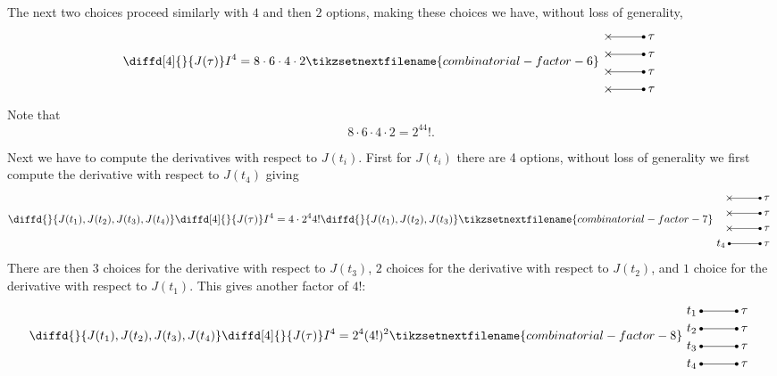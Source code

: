         The next two choices proceed similarly with \(4\) and then \(2\) options, making these choices we have, without loss of generality,
        \begin{equation}
            \diffd[4]{}{J(\tau)} I^4 = 8 \cdot 6 \cdot 4 \cdot 2 
            \tikzsetnextfilename{combinatorial-factor-6}
            \begin{tikzpicture}[baseline=0.7cm]
                \foreach \y in {0, 0.5, 1, 1.5} {
                    \draw (0, \y) -- (1, \y);
                    \node at (0, \y) {\(\times\)};
                    \fill (1, \y) circle [radius = 0.05] node[right] {\(\tau\)};
                }
            \end{tikzpicture}
        \end{equation}
        Note that
        \begin{equation}
            8 \cdot 6 \cdot 4 \cdot 2 = 2^44!.
        \end{equation}
        
        Next we have to compute the derivatives with respect to \(J(t_i)\).
        First for \(J(t_i)\) there are 4 options, without loss of generality we first compute the derivative with respect to \(J(t_4)\) giving
        \begin{equation*}
            \diffd{}{J(t_1),J(t_2),J(t_3),J(t_4)}\diffd[4]{}{J(\tau)} I^4 = 4 \cdot 2^44! \diffd{}{J(t_1),J(t_2),J(t_3)}
            \tikzsetnextfilename{combinatorial-factor-7}
            \begin{tikzpicture}[baseline=0.7cm]
                \foreach \y in {0, 0.5, 1, 1.5} {
                    \draw (0, \y) -- (1, \y);
                    \fill (1, \y) circle [radius = 0.05] node[right] {\(\tau\)};
                }
                \foreach \y in {0.5, 1, 1.5} {\node at (0, \y) {\(\times\)};}
                \fill (0, 0) circle [radius = 0.05] node[left] {\(t_4\)};
            \end{tikzpicture}
        \end{equation*}
        There are then \(3\) choices for the derivative with respect to \(J(t_3)\), \(2\) choices for the derivative with respect to \(J(t_2)\), and \(1\) choice for the derivative with respect to \(J(t_1)\).
        This gives another factor of \(4!\):
        \begin{equation}
            \diffd{}{J(t_1),J(t_2),J(t_3),J(t_4)}\diffd[4]{}{J(\tau)} I^4 = 2^4(4!)^2
            \tikzsetnextfilename{combinatorial-factor-8}
            \begin{tikzpicture}[baseline=0.7cm]
                \foreach \y in {0, 0.5, 1, 1.5} {
                    \draw (0, \y) -- (1, \y);
                    \fill (1, \y) circle [radius = 0.05] node[right] {\(\tau\)};
                    \fill (0, \y) circle [radius = 0.05] node[left] {\(t_{\pgfmathparse{int(4 - 2*\y)}\pgfmathresult}\)};
                }
            \end{tikzpicture}
        \end{equation}
        
